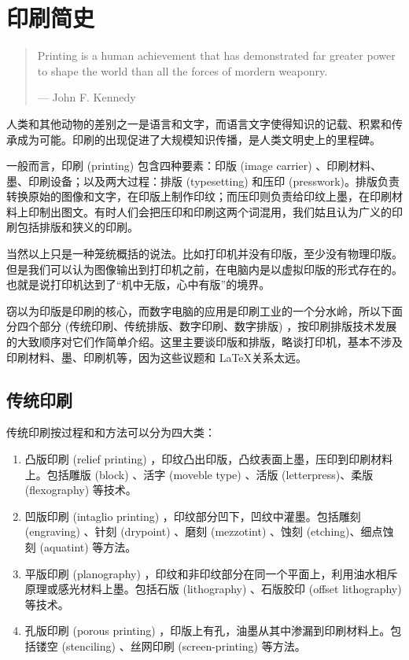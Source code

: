\chapter{印刷简史}
\label{chap:printing}

\begin{quotation}
Printing is a human achievement that has demonstrated far greater power to shape the world than all the forces of mordern weaponry.
\begin{flushright}
    --- John F. Kennedy
\end{flushright}
\end{quotation}

人类和其他动物的差别之一是语言和文字，而语言文字使得知识的记载、积累和传承成为可能。印刷的出现促进了大规模知识传播，是人类文明史上的里程碑。

一般而言，印刷 (printing) 包含四种要素：印版 (image carrier) 、印刷材料、墨、印刷设备；以及两大过程：排版 (typesetting) 和压印 (presswork)。排版负责转换原始的图像和文字，在印版上制作印纹；而压印则负责给印纹上墨，在印刷材料上印制出图文。有时人们会把压印和印刷这两个词混用，我们姑且认为广义的印刷包括排版和狭义的印刷。

当然以上只是一种笼统概括的说法。比如打印机并没有印版，至少没有物理印版。但是我们可以认为图像输出到打印机之前，在电脑内是以虚拟印版的形式存在的。也就是说打印机达到了“机中无版，心中有版”的境界。

窃以为印版是印刷的核心，而数字电脑的应用是印刷工业的一个分水岭，所以下面分四个部分 (传统印刷、传统排版、数字印刷、数字排版) ，按印刷排版技术发展的大致顺序对它们作简单介绍。这里主要谈印版和排版，略谈打印机，基本不涉及印刷材料、墨、印刷机等，因为这些议题和 \LaTeX 关系太远。

\section{传统印刷}
传统印刷按过程和和方法可以分为四大类：

\begin{enumerate}
    \item 凸版印刷 (relief printing) ，印纹凸出印版，凸纹表面上墨，压印到印刷材料上。包括雕版 (block) 、活字 (moveble type) 、活版 (letterpress)、柔版 (flexography) 等技术。
    \item 凹版印刷 (intaglio printing) ，印纹部分凹下，凹纹中灌墨。包括雕刻 (engraving) 、针刻 (drypoint) 、磨刻 (mezzotint) 、蚀刻 (etching)、细点蚀刻 (aquatint)  等方法。
    \item 平版印刷 (planography) ，印纹和非印纹部分在同一个平面上，利用油水相斥原理或感光材料上墨。包括石版 (lithography) 、石版胶印 (offset lithography) 等技术。
    \item 孔版印刷 (porous printing) ，印版上有孔，油墨从其中渗漏到印刷材料上。包括镂空 (stenciling) 、丝网印刷 (screen-printing) 等方法。
\end{enumerate}

